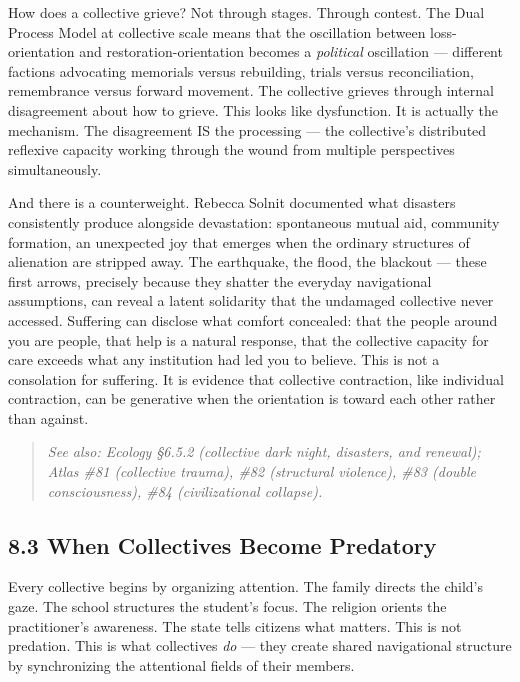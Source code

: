 How does a collective grieve? Not through stages. Through contest. The Dual Process Model at collective scale means that the oscillation between loss-orientation and restoration-orientation becomes a \textit{political} oscillation — different factions advocating memorials versus rebuilding, trials versus reconciliation, remembrance versus forward movement. The collective grieves through internal disagreement about how to grieve. This looks like dysfunction. It is actually the mechanism. The disagreement IS the processing — the collective's distributed reflexive capacity working through the wound from multiple perspectives simultaneously.


And there is a counterweight. Rebecca Solnit documented what disasters consistently produce alongside devastation: spontaneous mutual aid, community formation, an unexpected joy that emerges when the ordinary structures of alienation are stripped away. The earthquake, the flood, the blackout — these first arrows, precisely because they shatter the everyday navigational assumptions, can reveal a latent solidarity that the undamaged collective never accessed. Suffering can disclose what comfort concealed: that the people around you are people, that help is a natural response, that the collective capacity for care exceeds what any institution had led you to believe. This is not a consolation for suffering. It is evidence that collective contraction, like individual contraction, can be generative when the orientation is toward each other rather than against.


\begin{quote}
\itshape
\textit{See also: Ecology §6.5.2 (collective dark night, disasters, and renewal); Atlas \#81 (collective trauma), \#82 (structural violence), \#83 (double consciousness), \#84 (civilizational collapse).}
\end{quote}


\bigskip\noindent\makebox[\textwidth]{\color{rulegray}\rule{5cm}{0.3pt}}\bigskip


\subsection*{8.3 When Collectives Become Predatory}


Every collective begins by organizing attention. The family directs the child's gaze. The school structures the student's focus. The religion orients the practitioner's awareness. The state tells citizens what matters. This is not predation. This is what collectives \textit{do} — they create shared navigational structure by synchronizing the attentional fields of their members.


